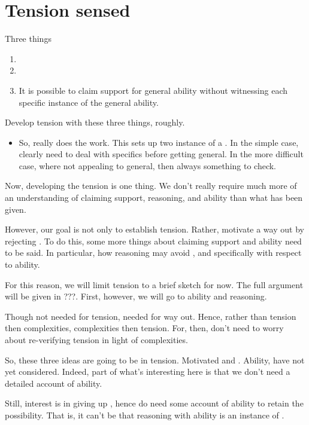 \chapter{Tension sensed}


\begin{note}
  Three things
  \begin{enumerate}
  \item \ideaCS{}
  \item \ESU{}
  \item It is possible to claim support for general ability without witnessing each specific instance of the general ability.
  \end{enumerate}

  Develop tension with these three things, roughly.

  \begin{itemize}
  \item So, \ideaCS{} really does the work.
    This sets up two instance of a \requ{}.
    In the simple case, clearly need to deal with specifics before getting general.
    In the more difficult case, where not appealing to general, then always something to check.
  \end{itemize}
\end{note}

\begin{note}
  Now, developing the tension is one thing.
  We don't really require much more of an understanding of claiming support, reasoning, and ability than what has been given.

  However, our goal is not only to establish tension.
  Rather, motivate a way out by rejecting \ESU{}.
  To do this, some more things about claiming support and ability need to be said.
  In particular, how reasoning may avoid \ESU{}, and specifically with respect to ability.

  For this reason, we will limit tension to a brief sketch for now.
  The full argument will be given in {\color{red} ???}.
  First, however, we will go to ability and reasoning.

  Though not needed for tension, needed for way out.
  Hence, rather than tension then complexities, complexities then tension.
  For, then, don't need to worry about re-verifying tension in light of complexities.
\end{note}

\begin{note}
  So, these three ideas are going to be in tension.
  Motivated \ideaCS{} and \ESU{}.
  Ability, have not yet considered.
  Indeed, part of what's interesting here is that we don't need a detailed account of ability.

  Still, interest is in giving up \ESU{}, hence do need some account of ability to retain the possibility.
  That is, it can't be that reasoning with ability is an instance of \ESU{}.
  
\end{note}

